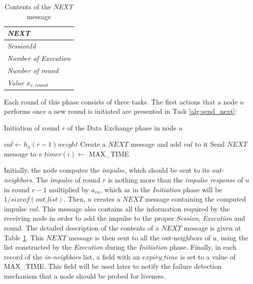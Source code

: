 \documentclass[a4paper,11pt,twoside]{report}
\begin{document}
\begin{table}
\centering
 \begin{tabular}{|l|}
	     	   	\hline
	     	   \textbf{\textit{NEXT}}\\
	     	   	\hline
	     	   	\hline
	     	   	 \textit{SessionId}\\
	     	     \textit{Number of Execution}\\
	     	     \textit{Number of round}\\
	     	     \textit{Value $x_{v,round}$}\\
	     	       \hline
	   \end{tabular}
	   \caption{Contents of the \textit{NEXT} message}
	   		     	   \label{table:next_msg}
\end{table}



Each round of this phase consists of three tasks. The first actions that a node $u$ performs once a new round is initiated are presented in Task \ref{alg:send_next}: 
\begin{algorithm}
 		\caption{Initiation of round $r$ of the Data Exchange phase in node $u$}
 		\label{alg:send_next}
 		\begin{algorithmic}[1]
 		\STATE $val \leftarrow h_u(r-1)weight$
 		\STATE Create a $NEXT$ message and add $val$ to it
 		\STATE Send $NEXT$ message to $v$
 		\ENDFOR
 		\STATE $timer(i) \leftarrow$ MAX\_TIME
 		\ENDFOR
 		\end{algorithmic}
 	\end{algorithm}

Initially, the node computes the \textit{impulse}, which should be sent to its \textit{out-neighbors}. The \textit{impulse} of round $r$ is nothing more than the \textit{impulse response} of $u$ in round $r-1$ multiplied by $a_{vu}$, which as in the \textit{Initiation} phase will be $1/sizeof(out\_list)$. Then, $u$ creates a $NEXT$ message containing the computed impulse $val$. This message also contains all the information required by the receiving node in order to add the impulse to the proper \textit{Session}, \textit{Execution} and round. The detailed description of the contents of a $NEXT$ message is given at Table \ref{table:next_msg}. This $NEXT$ message is then sent to all the out-neighbors of $u$, using the list constructed by the \textit{Execution} during the \textit{Initiation} phase. Finally, in each record of the \textit{in-neighbors} list, a field with an $expiry\_time$ is set to a value of MAX\_TIME. This field will be used later to notify the failure detection mechanism that a node should be probed for liveness. \\
 
\end{document}
